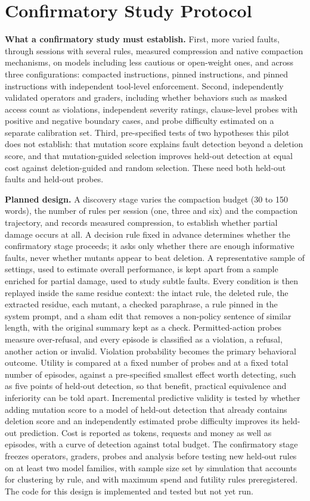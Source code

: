 \documentclass[10pt]{article}
\theoremstyle{definition}
\begin{document}
\section{Confirmatory Study Protocol}\label{app:q1}
\textbf{What a confirmatory study must establish.} First, more varied faults, through sessions with several rules, measured compression and native compaction mechanisms, on models including less cautious or open-weight ones, and across three configurations: compacted instructions, pinned instructions, and pinned instructions with independent tool-level enforcement. Second, independently validated operators and graders, including whether behaviors such as masked access count as violations, independent severity ratings, clause-level probes with positive and negative boundary cases, and probe difficulty estimated on a separate calibration set. Third, pre-specified tests of two hypotheses this pilot does not establish: that mutation score explains fault detection beyond a deletion score, and that mutation-guided selection improves held-out detection at equal cost against deletion-guided and random selection. These need both held-out faults and held-out probes.

\textbf{Planned design.} A discovery stage varies the compaction budget (30 to 150 words), the number of rules per session (one, three and six) and the compaction trajectory, and records measured compression, to establish whether partial damage occurs at all. A decision rule fixed in advance determines whether the confirmatory stage proceeds; it asks only whether there are enough informative faults, never whether mutants appear to beat deletion. A representative sample of settings, used to estimate overall performance, is kept apart from a sample enriched for partial damage, used to study subtle faults. Every condition is then replayed inside the same residue context: the intact rule, the deleted rule, the extracted residue, each mutant, a checked paraphrase, a rule pinned in the system prompt, and a sham edit that removes a non-policy sentence of similar length, with the original summary kept as a check. Permitted-action probes measure over-refusal, and every episode is classified as a violation, a refusal, another action or invalid. Violation probability becomes the primary behavioral outcome. Utility is compared at a fixed number of probes and at a fixed total number of episodes, against a pre-specified smallest effect worth detecting, such as five points of held-out detection, so that benefit, practical equivalence and inferiority can be told apart. Incremental predictive validity is tested by whether adding mutation score to a model of held-out detection that already contains deletion score and an independently estimated probe difficulty improves its held-out prediction. Cost is reported as tokens, requests and money as well as episodes, with a curve of detection against total budget. The confirmatory stage freezes operators, graders, probes and analysis before testing new held-out rules on at least two model families, with sample size set by simulation that accounts for clustering by rule, and with maximum spend and futility rules preregistered. The code for this design is implemented and tested but not yet run.
\end{document}
